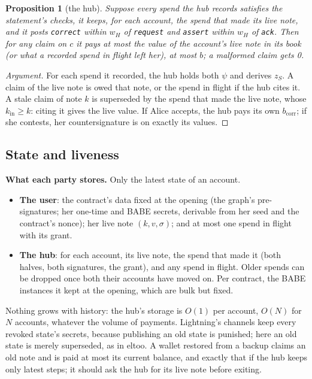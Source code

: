 \documentclass[11pt]{article}
\theoremstyle{plain}
\newtheorem{proposition}{Proposition}
\theoremstyle{definition}
\newcommand{\bcorr}{b_{\mathrm{corr}}}
\newcommand{\tx}[1]{\texttt{#1}}
\newcommand{\kin}{k_{\mathrm{in}}}
\begin{document}
\begin{proposition}[the hub]\label{prop:hub}
Suppose every spend the hub records satisfies the statement's checks,
it keeps, for each account, the spend that made its live note, and it
posts \tx{correct} within $w_H$ of \tx{request} and \tx{assert} within
$w_H$ of \tx{ack}. Then for any claim on $c$ it pays at most the value
of the account's live note in its book (or what a recorded spend in
flight left her), at most $b$; a malformed claim gets 0.
\end{proposition}
\begin{proof}[Argument]
For each spend it recorded, the hub holds both $\psi$ and derives
$z_S$. A claim of the live note is owed that note, or the spend in
flight if the hub cites it. A stale claim of note $k$ is superseded by
the spend that made the live note, whose $\kin \ge k$: citing it gives
the live value. If Alice accepts, the hub pays its own $\bcorr$; if she
contests, her countersignature is on exactly its values.
\end{proof}

\subsection{State and liveness}\label{sec:state}

\textbf{What each party stores.} Only the latest state of an account.
\begin{itemize}[nosep]
\item \textbf{The user}: the contract's data fixed at the opening (the
  graph's pre-signatures; her one-time and BABE secrets, derivable from
  her seed and the contract's nonce); her live note $(k, v, \sigma)$;
  and at most one spend in flight with its grant.
\item \textbf{The hub}: for each account, its live note, the spend that
  made it (both halves, both signatures, the grant), and any spend in
  flight. Older spends can be dropped once both their accounts have
  moved on. Per contract, the BABE instances it kept at the opening,
  which are bulk but fixed.
\end{itemize}
Nothing grows with history: the hub's storage is $O(1)$ per account,
$O(N)$ for $N$ accounts, whatever the volume of payments. Lightning's
channels keep every revoked state's secrets, because publishing an old
state is punished; here an old state is merely superseded, as in eltoo.
A wallet restored from a backup claims an old note and is paid at most
its current balance, and exactly that if the hub keeps only latest
steps; it should ask the hub for its live note before exiting.
\end{document}
